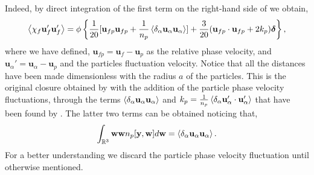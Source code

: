 Indeed, by direct integration of the first term on the right-hand side of \citet{eq:batchlor_avg} we obtain, 
\begin{equation}
    \avg{\chi_f \textbf{u}_f'\textbf{u}_f'}
    = \phi \left\{
        \frac{1}{20}[\textbf{u}_{fp}\textbf{u}_{fp}+ \frac{1}{n_p}\pavg{\textbf{u}_\alpha\textbf{u}_\alpha}]
        + 
        \frac{3}{20} (\textbf{u}_{fp}\cdot \textbf{u}_{fp} + 2k_p)\bm\delta
    \right\},
    \label{eq:van_wingarden_sol}
\end{equation} 
where we have defined, $ \textbf{u}_{fp} = \textbf{u}_f - \textbf{u}_p$ as the relative phase velocity, and $\textbf{u}_\alpha' = \textbf{u}_\alpha - \textbf{u}_p$ and the particles fluctuation velocity. 
Notice that all the distances have been made dimensionless with the radius $a$ of the particles. 
This is the original closure obtained by \citet{van1998pseudo} with the addition of the particle phase velocity fluctuations, through the terms $\left<\delta_\alpha \textbf{u}_\alpha\textbf{u}_\alpha\right>$ and $k_p = \frac{1}{n_p}\left<\delta_\alpha \textbf{u}_\alpha'\cdot\textbf{u}_\alpha'\right>$ that have been found by \citet{zhang1994averaged}. 
The latter two terms can be obtained noticing that, 
\begin{equation}
    \int_{\mathbb{R}^3} \textbf{ww} n_p[\textbf{y},\textbf{w}] d\textbf{w}
    = \left<\delta_\alpha \textbf{u}_\alpha\textbf{u}_\alpha\right>. 
\end{equation}
For a better understanding we discard the particle phase velocity fluctuation until otherwise mentioned. 


